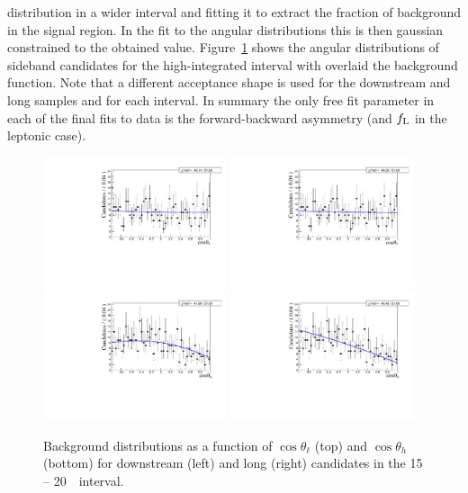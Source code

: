 distribution in a wider interval and fitting it to extract the fraction of background in the signal region.
In the fit to the angular distributions this is then gaussian constrained to the obtained value.
%
Figure~\ref{fig:cosThetaLbkg} shows the angular distributions of sideband candidates
for the high-\qsq integrated interval with overlaid the background function.
Note that a different acceptance shape is used for the downstream and long samples and for each \qsq interval.
%
In summary the only free fit parameter in each of the final fits to data is the forward-backward asymmetry
(and $f_{\rm L}$ in the leptonic case). 
%
\begin{figure}[h]
\centering
\includegraphics[width=0.48\textwidth]{Lmumu/figs/AngularBkgFits/BkgFit_highq2_DD.pdf}
\includegraphics[width=0.48\textwidth]{Lmumu/figs/AngularBkgFits/BkgFit_highq2_LL.pdf}
\includegraphics[width=0.48\textwidth]{Lmumu/figs/AngularBkgFits/BkgFitB_highq2_DD.pdf}
\includegraphics[width=0.48\textwidth]{Lmumu/figs/AngularBkgFits/BkgFitB_highq2_LL.pdf}
\caption{Background distributions as a function of $\cos\theta_\ell$ (top) and $\cos\theta_h$ (bottom)
for downstream (left) and long (right) candidates in the 15 -- 20~\gevgevcccc ~\qsq interval.  }
\label{fig:cosThetaLbkg}
\end{figure}

